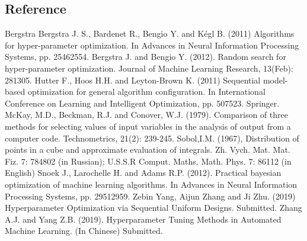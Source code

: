 \documentclass[letterpaper,10pt,english]{sphinxmanual}
\begin{document}
\subsection{Reference}
\label{\detokenize{resources:reference}}
\begin{sphinxthebibliography}{Bergstra}
Bergstra J. S., Bardenet R., Bengio Y. and Kégl B. (2011) Algorithms for hyper-parameter optimization. In Advances in Neural Information Processing Systems, pp. 2546\textendash{}2554.
Bergstra J. and Bengio Y. (2012). Random search for hyper-parameter optimization. Journal of Machine Learning Research, 13(Feb): 281\textendash{}305.
Hutter F., Hoos H.H. and Leyton-Brown K. (2011) Sequential model-based optimization for general algorithm configuration. In International Conference on Learning and Intelligent Optimization, pp. 507\textendash{}523. Springer.
McKay, M.D., Beckman, R.J. and Conover, W.J. (1979). Comparison of three methods for selecting values of input variables in the analysis of output from a computer code. Technometrics, 21(2): 239-245.
Sobol,I.M. (1967), Distribution of points in a cube and approximate evaluation of integrals. Zh. Vych. Mat. Mat. Fiz. 7: 784\textendash{}802 (in Russian); U.S.S.R Comput. Maths. Math. Phys. 7: 86\textendash{}112 (in English)
Snoek J., Larochelle H. and Adams R.P. (2012). Practical bayesian optimization of machine learning algorithms. In Advances in Neural Information Processing Systems, pp. 2951\textendash{}2959.
Zebin Yang, Aijun Zhang and Ji Zhu. (2019) Hyperparameter Optimization via Sequential Uniform Designs. Submitted.
Zhang A.J. and Yang Z.B. (2019). Hyperparameter Tuning Methods in Automated Machine Learning. (In Chinese) Submitted.
\end{sphinxthebibliography}
\end{document}
